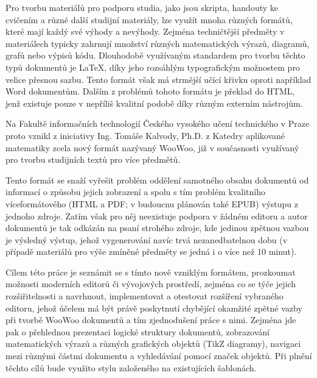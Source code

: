 Pro tvorbu materiálů pro podporu studia, jako jsou skripta, handouty ke cvičením a různé další studijní materiály, lze
využít mnoha různých formátů, které mají každý své výhody a nevýhody. Zejména techničtější předměty v materiálech
typicky zahrnují množství různých matematických výrazů, diagramů, grafů nebo výpisů kódu. Dlouhodobě využívaným
standardem pro tvorbu těchto typů dokumentů je \LaTeX{}, díky jeho rozsáhlým typografickým možnostem pro velice přesnou
sazbu. Tento formát však má strmější učící křivku oproti například Word dokumentům. Dalším z problémů tohoto formátu je
překlad do HTML, jenž existuje pouze v nepříliš kvalitní podobě díky různým externím nástrojům.

Na Fakultě informačních technologií Českého vysokého učení technického v Praze proto vznikl z iniciativy Ing. Tomáše
Kalvody, Ph.D. z Katedry aplikované matematiky zcela nový formát nazývaný WooWoo, již v současnosti využívaný pro tvorbu
studijních textů pro více předmětů.

Tento formát se snaží vyřešit problém oddělení samotného obsahu dokumentů od informací o způsobu jejich zobrazení a
spolu s tím problém kvalitního víceformátového (HTML a PDF; v budoucnu plánován také EPUB) výstupu z jednoho zdroje.
Zatím však pro něj neexistuje podpora v žádném editoru a autor dokumentů je tak odkázán na psaní strohého zdroje, kde
jedinou zpětnou vazbou je výsledný výstup, jehož vygenerování navíc trvá nezanedbatelnou dobu (v případě materiálů pro
výše zmíněné předměty se jedná i o více než 10 minut).

Cílem této práce je seznámit se s tímto nově vzniklým formátem, prozkoumat možnosti moderních editorů či vývojových
prostředí, zejména co se týče jejich rozšiřitelnosti a navrhnout, implementovat a otestovat rozšíření vybraného editoru,
jehož účelem má být právě poskytnutí chybějící okamžité zpětné vazby při tvorbě WooWoo dokumentů a tím zjednodušení
práce s nimi. Zejména jde pak o přehlednou prezentaci logické struktury dokumentů, zobrazování matematických výrazů a
různých grafických objektů (TikZ diagramy), navigaci mezi různými částmi dokumentu a vyhledávání pomocí značek objektů.
Při plnění těchto cílů bude využito stylu založeného na existujících šablonách.
